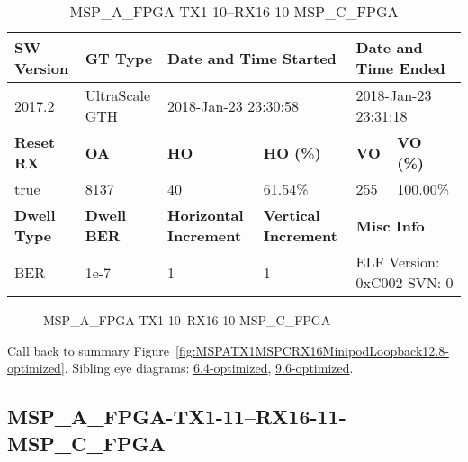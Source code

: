 \begin{table}[h]
\centering
\caption{MSP\_A\_FPGA-TX1-10--RX16-10-MSP\_C\_FPGA}
\label{tab:MSPAFPGATX110RX1610MSPCFPGA12.8-optimized}
\begin{tabular}{@{}|l|l|l|l|l|l|@{}}
\toprule
\textbf{SW Version}                & \textbf{GT Type}   & \multicolumn{2}{l|}{\textbf{Date and Time Started}}            & \multicolumn{2}{l|}{\textbf{Date and Time Ended}}        \\ \midrule
2017.2                       & UltraScale GTH          & \multicolumn{2}{l|}{2018-Jan-23 23:30:58}                   & \multicolumn{2}{l|}{2018-Jan-23 23:31:18}               \\ \midrule
\textbf{Reset RX}                  & \textbf{OA} & \textbf{HO}   & \textbf{HO (\%)} & \textbf{VO} & \textbf{VO (\%)} \\ \midrule
true & 8137        & 40          & 61.54\%        & 255        & 100.00\%       \\ \midrule
\textbf{Dwell Type}                & \textbf{Dwell BER} & \textbf{Horizontal Increment} & \textbf{Vertical Increment}    & \multicolumn{2}{l|}{\textbf{Misc Info}}                  \\ \midrule
BER                            & 1e-7        & 1        & 1           & \multicolumn{2}{l|}{ELF Version: 0xC002 SVN: 0}                         \\ \bottomrule
\end{tabular}
\end{table}

\begin{figure}[h]
\caption{MSP\_A\_FPGA-TX1-10--RX16-10-MSP\_C\_FPGA} \label{fig:MSPAFPGATX110RX1610MSPCFPGA12.8-optimized}
\end{figure}

Call back to summary Figure~\ref{fig:MSPATX1MSPCRX16MinipodLoopback12.8-optimized}.
Sibling eye diagrams: \hyperref[sec:MSPAFPGATX110RX1610MSPCFPGA6.4-optimized]{6.4-optimized}, \hyperref[sec:MSPAFPGATX110RX1610MSPCFPGA9.6-optimized]{9.6-optimized}.

\clearpage
\newpage


\subsection{MSP\_A\_FPGA-TX1-11--RX16-11-MSP\_C\_FPGA}\label{sec:MSPAFPGATX111RX1611MSPCFPGA12.8-optimized}


